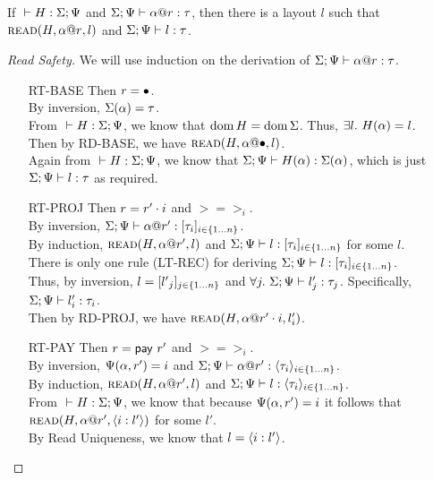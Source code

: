 \begin{lem}
If ${} \vdash {H} : {\Sigma;\Psi}$ and ${\Sigma;\Psi} \vdash {{\alpha}@{r}} : {\tau}$,
then there is a layout $l$ such that $\textsc{read}({H},{{\alpha}@{r}},{l})$ and ${\Sigma;\Psi} \vdash {l} : {\tau}$.
\end{lem}

\begin{proof}[Read Safety]
  We will use induction on the derivation of ${\Sigma;\Psi} \vdash {{\alpha}@{r}} : {\tau}$.
  \begin{itemize}
    \item[\textsc{RT-BASE}] Then $r = \bullet$. \\
      By inversion, $\Sigma(\alpha)=\tau$. \\
      From ${} \vdash {H} : {\Sigma;\Psi}$, we know that $\operatorname{dom}{H}=\operatorname{dom}{\Sigma}$.
      Thus, $\exists l.~H(\alpha)=l$. \\
      Then by \textsc{RD-BASE}, we have $\textsc{read}({H},{{\alpha}@{\bullet}},{l})$. \\
      Again from ${} \vdash {H} : {\Sigma;\Psi}$, we know that ${\Sigma;\Psi} \vdash {H(\alpha)} : {\Sigma(\alpha)}$,
      which is just ${\Sigma;\Psi} \vdash {l} : {\tau}$ as required.
    \item[\textsc{RT-PROJ}] Then $r = {r'}\cdot{i}$ and $\gt = \gt_i$. \\
      By inversion, ${\Sigma;\Psi} \vdash {{\alpha}@{r'}} : {[{{\tau}_{i}}]_{{i} \in \{1 \ldots {n}\} }}$. \\
      By induction, $\textsc{read}({H},{{\alpha}@{r'}},{l})$
      and ${\Sigma;\Psi} \vdash {l} : {[{{\tau}_{i}}]_{{i} \in \{1 \ldots {n}\} }}$ for some $l$. \\
      There is only one rule (\textsc{LT-REC}) for deriving ${\Sigma;\Psi} \vdash {l} : {[{{\tau}_{i}}]_{{i} \in \{1 \ldots {n}\} }}$. \\
      Thus, by inversion, $l = [{{l'}_{j}}]_{{j} \in \{1 \ldots {n}\} }$ 
      and $\forall j.~{\Sigma;\Psi} \vdash {l'_j} : {\tau_j}$.
      Specifically, ${\Sigma;\Psi} \vdash {l'_i} : {\tau_i}$. \\
      Then by \textsc{RD-PROJ}, we have $\textsc{read}({H},{{\alpha}@{{r'}\cdot{i}}},{l'_i})$.
    \item[\textsc{RT-PAY}] Then $r = \mathsf{pay}~{r'}$ and $\gt = \gt_i$. \\
      By inversion, $\Psi(\alpha,r')=i$ and ${\Sigma;\Psi} \vdash {{\alpha}@{r'}} : {\langle{{\tau}_{i}}\rangle_{{i} \in \{1 \ldots {n}\} }}$. \\
      By induction, $\textsc{read}({H},{{\alpha}@{r'}},{l})$
      and ${\Sigma;\Psi} \vdash {l} : {\langle{{\tau}_{i}}\rangle_{{i} \in \{1 \ldots {n}\} }}$. \\
      From ${} \vdash {H} : {\Sigma;\Psi}$, we know that because $\Psi(\alpha,r')=i$
      it follows that $\textsc{read}({H},{{\alpha}@{r'}},{\langle{{i}:{l'}}\rangle})$ for some $l'$. \\
      By Read Uniqueness, we know that $l = \langle{{i}:{l'}}\rangle$. \\

\end{itemize}
\end{proof}
